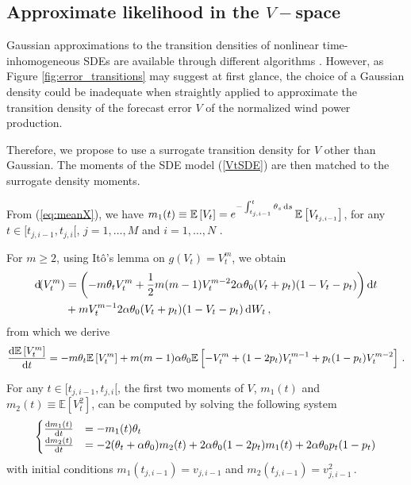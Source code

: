 \documentclass[11pt]{article}
\theoremstyle{definition}
\begin{document}
\subsection{Approximate likelihood  in the $V-$space} \label{moments_ODEs}

Gaussian approximations to the transition densities of nonlinear time-inhomogeneous SDEs are available through different algorithms \autocite[Chapter 9]{saso}. However, as Figure \ref{fig:error_transitions} may suggest at first glance, the choice of a Gaussian density could be inadequate when straightly applied to approximate the transition density of the forecast error $V$ of the normalized wind power production. 

Therefore, we propose to use a surrogate transition density for $V$ other than Gaussian. The moments of the SDE model (\ref{VtSDE}) are then matched to the surrogate density moments. 

From (\ref{eq:meanX}), we have $m_1(t) \equiv \mathbb{E} \left[V_t\right] = e^{- \int_{t_{j,i-1}}^t \theta_s \dif s} \,\mathbb{E} \left[V_{t_{j,i-1}}\right]$, for any $t\in [t_{j,i-1}, t_{j, i}[$, $j = 1, \ldots, M$ and $i = 1, \ldots, N$ .

For $m \geq 2$, using It\^o's lemma on $g(V_t) = V_t^m$, we obtain
\begin{align}
\dif (V_t^m) & = \left( - m \theta_t V_t^m + \frac{1}{2} m (m -1) V_t^{m -2} 2 \alpha \theta_0 (V_t + p_t) (1 - V_t - p_t) \right) \dif t  \nonumber \\
& + m V_t^{m-1} 2 \alpha \theta_0 (V_t + p_t) (1 - V_t - p_t) \dif W_t \,, \nonumber
\end{align}
from which we derive
\begin{equation}
\frac{\dif  \mathbb{E}\left[ V^m_t\right]}{\dif t} = - m \theta_t \mathbb{E}\left[ V^m_t\right] + m (m-1) \alpha \theta_0  \mathbb{E}\left[ - V_t^m + (1 - 2 p_t) V_t^{m-1} + p_t (1 -p_t) V_t^{m-2} \right] \,.
\end{equation}

For any $t\in [t_{j,i-1}, t_{j, i}[$, the first two moments of $V$, $m_1(t)$ and $m_2(t) \equiv \mathbb{E}\left[V_t^2\right]$, can be computed by solving the following system
\begin{equation}
\begin{cases}
\frac{\dif  m_1 (t)}{\dif t} &=  - m_1(t)\theta_t   \\
\frac{\dif  m_2 (t)}{\dif t} &=  -2 (\theta_t +\alpha \theta_0) m_2(t) + 2 \alpha\theta_0 (1-2p_t)  m_1(t) + 2 \alpha\theta_0 p_t (1-p_t) 
\end{cases}
\label{Vtmom}
\end{equation}
with initial conditions $m_1(t_{j,i-1})= v_{j, i-1}$ and $m_2(t_{j,i-1})= v_{j, i-1}^2 \,.$
\end{document}
